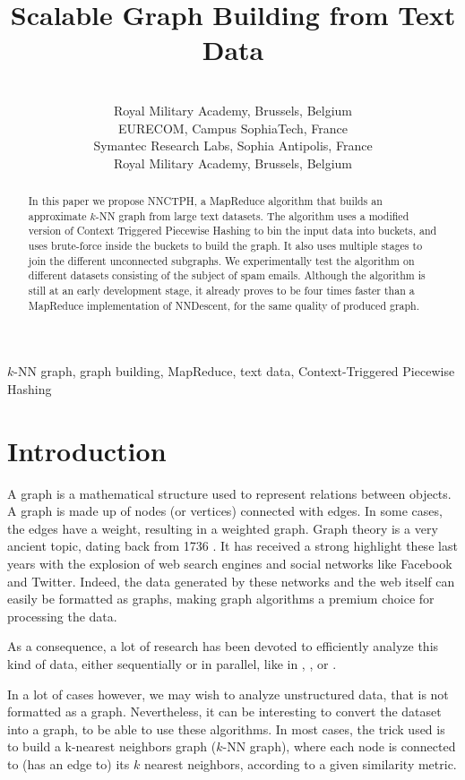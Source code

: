 \documentclass[wcp]{jmlr}
\title[Scalable Graph Building from Text Data]{Scalable Graph Building from Text Data}
\author{\Name{Thibault Debatty} \Email{thibault.debatty@rma.ac.be}\\
  \addr Royal Military Academy, Brussels, Belgium
  \AND
  \Name{Pietro Michiardi} \Email{pietro.michiardi@eurecom.fr}\\
  \addr EURECOM, Campus SophiaTech, France
  \AND
  \Name{Olivier Thonnard} \Email{olivier\_thonnard@symantec.com}\\
  \addr Symantec Research Labs, Sophia Antipolis, France
  \AND
  \Name{Wim Mees} \Email{wim.mees@rma.ac.be}\\
  \addr Royal Military Academy, Brussels, Belgium
 }
\begin{document}
\maketitle

\begin{abstract}
In this paper we propose NNCTPH, a MapReduce algorithm that builds an approximate $k$-NN graph from large text datasets. The algorithm uses a modified version of Context Triggered Piecewise Hashing to bin the input data into buckets, and uses brute-force inside the buckets to build the graph. It also uses multiple stages to join the different unconnected subgraphs. We experimentally test the algorithm on different datasets consisting of the subject of spam emails.  Although the algorithm is still at an early development stage, it already proves to be four times faster than a MapReduce implementation of NNDescent, for the same quality of produced graph.
\end{abstract}

\begin{keywords}
$k$-NN graph, graph building, MapReduce, text data, Context-Triggered Piecewise Hashing
\end{keywords}

\section{Introduction}
A graph is a mathematical structure used to represent relations between objects. A graph is made up of nodes (or vertices) connected with edges. In some cases, the edges have a weight, resulting in a weighted graph. Graph theory is a very ancient topic, dating back from 1736 \cite{Biggs1986}. It has received a strong highlight these last years with the explosion of web search engines and social networks like Facebook and Twitter. Indeed, the data generated by these networks and the web itself can easily be formatted as graphs, making graph algorithms a premium choice for processing the data.

As a consequence, a lot of research has been devoted to efficiently analyze this kind of data, either sequentially or in parallel, like in \cite{Rajaraman2010b}, \cite{Liben2005}, \cite{Broder:2000:GSW:347319.346290} or \cite{Scott:2011:SHS:2392673}.

In a lot of cases however, we may wish to analyze unstructured data, that is not formatted as a graph. Nevertheless, it can be interesting to convert the dataset into a graph, to be able to use these algorithms. In most cases, the trick used is to build a k-nearest neighbors graph ($k$-NN graph), where each node is connected to (has an edge to) its $k$ nearest neighbors, according to a given similarity metric.
\end{document}
